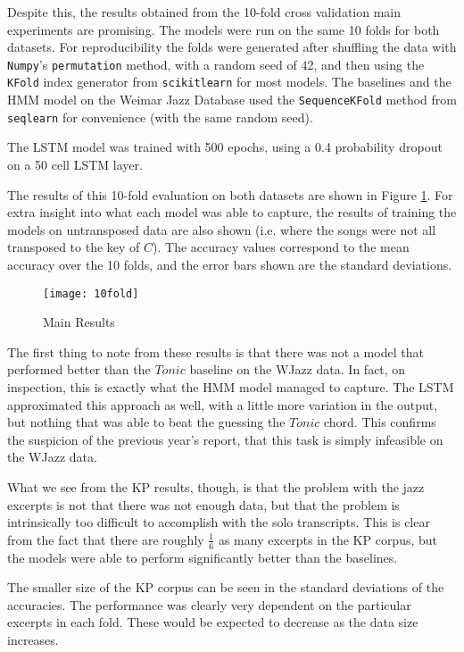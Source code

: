 \documentclass[bsc,singlespacing,logo, parskip, deptreport]{infthesis}
\begin{document}
Despite this, the results obtained from the 10-fold cross validation main experiments are promising. The models were run on the same 10 folds for both datasets. For reproducibility the folds were generated after shuffling the data with {\tt Numpy}'s {\tt permutation} method, with a random seed of 42, and then using the {\tt KFold} index generator from {\tt scikitlearn} \cite{scikit-learn} for most models. The baselines and the HMM model on the Weimar Jazz Database used the {\tt SequenceKFold} method from {\tt seqlearn} for convenience (with the same random seed).

The LSTM model was trained with 500 epochs, using a 0.4 probability dropout \cite{srivastava2014dropout} on a 50 cell LSTM layer.

The results of this 10-fold evaluation on both datasets are shown in Figure \ref{main results}. For extra insight into what each model was able to capture, the results of training the models on untransposed data are also shown (i.e. where the songs were not all transposed to the key of $C$). The accuracy values correspond to the mean accuracy over the 10 folds, and the error bars shown are the standard deviations.

\begin{landscape}
  \begin{figure}[h!]
    \caption{Main Results}
    \label{main results}
    \texttt{[image: 10fold]}
  \end{figure}
\end{landscape}

The first thing to note from these results is that there was not a model that performed better than the $Tonic$ baseline on the WJazz data. In fact, on inspection, this is exactly what the HMM model managed to capture. The LSTM approximated this approach as well, with a little more variation in the output, but nothing that was able to beat the guessing the $Tonic$ chord. This confirms the suspicion of the previous year's report, that this task is simply infeasible on the WJazz data.

What we see from the KP results, though, is that the problem with the jazz excerpts is not that there was not enough data, but that the problem is intrinsically too difficult to accomplish with the solo transcripts. This is clear from the fact that there are roughly $\frac{1}{6}$ as many excerpts in the KP corpus, but the models were able to perform significantly better than the baselines.

The smaller size of the KP corpus can be seen in the standard deviations of the accuracies. The performance was clearly very dependent on the particular excerpts in each fold. These would be expected to decrease as the data size increases.
\end{document}
